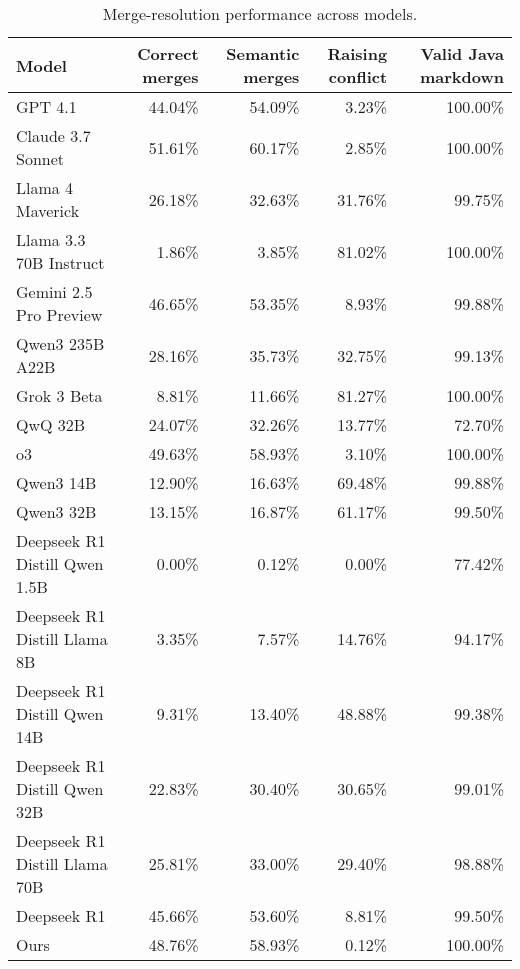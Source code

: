 \begin{table}[ht]
\centering
\begin{tabular}{lrrrr}
\toprule
Model & Correct merges & Semantic merges & Raising conflict & Valid Java markdown \\
\midrule
GPT 4.1 & 44.04\% & 54.09\% & 3.23\% & 100.00\% \\
Claude 3.7 Sonnet & 51.61\% & 60.17\% & 2.85\% & 100.00\% \\
Llama 4 Maverick & 26.18\% & 32.63\% & 31.76\% & 99.75\% \\
Llama 3.3 70B Instruct & 1.86\% & 3.85\% & 81.02\% & 100.00\% \\
Gemini 2.5 Pro Preview & 46.65\% & 53.35\% & 8.93\% & 99.88\% \\
Qwen3 235B A22B & 28.16\% & 35.73\% & 32.75\% & 99.13\% \\
Grok 3 Beta & 8.81\% & 11.66\% & 81.27\% & 100.00\% \\
QwQ 32B & 24.07\% & 32.26\% & 13.77\% & 72.70\% \\
o3 & 49.63\% & 58.93\% & 3.10\% & 100.00\% \\
Qwen3 14B & 12.90\% & 16.63\% & 69.48\% & 99.88\% \\
Qwen3 32B & 13.15\% & 16.87\% & 61.17\% & 99.50\% \\
Deepseek R1 Distill Qwen 1.5B & 0.00\% & 0.12\% & 0.00\% & 77.42\% \\
Deepseek R1 Distill Llama 8B & 3.35\% & 7.57\% & 14.76\% & 94.17\% \\
Deepseek R1 Distill Qwen 14B & 9.31\% & 13.40\% & 48.88\% & 99.38\% \\
Deepseek R1 Distill Qwen 32B & 22.83\% & 30.40\% & 30.65\% & 99.01\% \\
Deepseek R1 Distill Llama 70B & 25.81\% & 33.00\% & 29.40\% & 98.88\% \\
Deepseek R1 & 45.66\% & 53.60\% & 8.81\% & 99.50\% \\
Ours & 48.76\% & 58.93\% & 0.12\% & 100.00\% \\
\bottomrule
\end{tabular}
\caption{Merge-resolution performance across models.}
\end{table}
